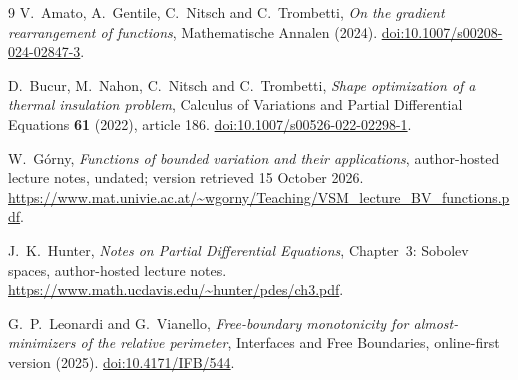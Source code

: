 \begin{thebibliography}{9}
V.~Amato, A.~Gentile, C.~Nitsch and C.~Trombetti,
\emph{On the gradient rearrangement of functions},
Mathematische Annalen (2024).
\href{https://doi.org/10.1007/s00208-024-02847-3}{doi:10.1007/s00208-024-02847-3}.

D.~Bucur, M.~Nahon, C.~Nitsch and C.~Trombetti,
\emph{Shape optimization of a thermal insulation problem},
Calculus of Variations and Partial Differential Equations
\textbf{61} (2022), article 186.
\href{https://doi.org/10.1007/s00526-022-02298-1}{doi:10.1007/s00526-022-02298-1}.

W.~G\'orny,
\emph{Functions of bounded variation and their applications},
author-hosted lecture notes, undated; version retrieved 15 October 2026.
\url{https://www.mat.univie.ac.at/~wgorny/Teaching/VSM_lecture_BV_functions.pdf}.

J.~K.~Hunter,
\emph{Notes on Partial Differential Equations}, Chapter~3:
Sobolev spaces, author-hosted lecture notes.
\url{https://www.math.ucdavis.edu/~hunter/pdes/ch3.pdf}.

G.~P.~Leonardi and G.~Vianello,
\emph{Free-boundary monotonicity for almost-minimizers of the relative perimeter},
Interfaces and Free Boundaries, online-first version (2025).
\href{https://doi.org/10.4171/IFB/544}{doi:10.4171/IFB/544}.
\end{thebibliography}
